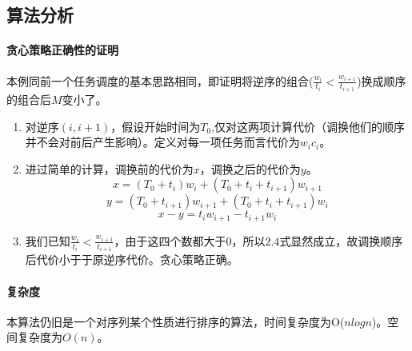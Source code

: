 \subsection{算法分析}

\paragraph*{贪心策略正确性的证明}
本例同前一个任务调度的基本思路相同，即证明将逆序的组合($\frac{w_i}{t_i} < \frac{w_{i+1}}{t_{i+1}}$)换成顺序的组合后$M$变小了。

\begin{enumerate}
    \item 对逆序$(i,i+1)$，假设开始时间为$T_0$,仅对这两项计算代价（调换他们的顺序并不会对前后产生影响）。定义对每一项任务而言代价为$w_ic_i$。
    \item 进过简单的计算，调换前的代价为$x$，调换之后的代价为$y$。
    \begin{equation}
        x=(T_0+t_i)w_i+(T_0+t_i+t_{i+1})w_{i+1}
    \end{equation}
    \begin{equation}
        y=(T_0+t_{i+1})w_{i+1}+(T_0+t_i+t_{i+1})w_i
    \end{equation}
    \begin{equation}
        x-y=t_iw_{i+1}-t_{i+1}w_i
    \end{equation}
    \item 我们已知$\frac{w_i}{t_i} < \frac{w_{i+1}}{t_{i+1}}$，由于这四个数都大于0，所以$2.4$式显然成立，故调换顺序后代价小于于原逆序代价。贪心策略正确。
\end{enumerate}

\paragraph*{复杂度}
本算法仍旧是一个对序列某个性质进行排序的算法，时间复杂度为O($nlogn$)。空间复杂度为$O(n)$。
